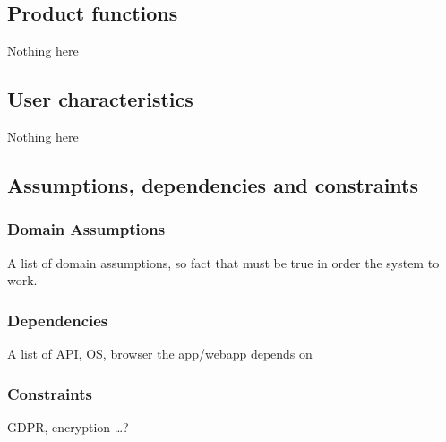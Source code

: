 \subsection{Product functions}
Nothing here

\subsection{User characteristics}
Nothing here

\subsection{Assumptions, dependencies and constraints}
\subsubsection*{Domain Assumptions}
A list of domain assumptions, so fact that must be true in order the system to work.
\subsubsection*{Dependencies}
A list of API, OS, browser the app/webapp depends on
\subsubsection*{Constraints}
GDPR, encryption \dots?
